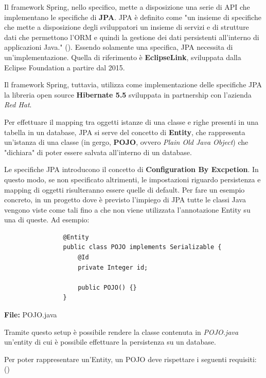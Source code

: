         Il framework Spring, nello specifico, mette a disposizione una serie di API che implementano le specifiche di \textbf{JPA}. JPA è definito come "un insieme di specifiche che mette a disposizione degli sviluppatori un insieme di servizi e di strutture dati che permettono l'ORM e quindi la gestione dei dati persistenti all'interno di applicazioni Java." (\cite{jpa}). Essendo solamente una specifica, JPA necessita di un'implementazione. Quella di riferimento è \textbf{EclipseLink}, sviluppata dalla Eclipse Foundation a partire dal 2015.

        Il framework Spring, tuttavia, utilizza come implementazione delle specifiche JPA la libreria open source \textbf{Hibernate 5.5} sviluppata in partnership con l'azienda \textit{Red Hat}. 

        Per effettuare il mapping tra oggetti istanze di una classe e righe presenti in una tabella in un database, JPA si serve del concetto di \textbf{Entity}, che rappresenta un'istanza di una classe (in gergo, \textbf{POJO}, ovvero \textit{Plain Old Java Object}) che "dichiara" di poter essere salvata all'interno di un database.

        Le specifiche JPA introducono il concetto di \textbf{Configuration By Excpetion}. In questo modo, se non specificato altrimenti, le impostazioni riguardo persistenza e mapping di oggetti risulteranno essere quelle di default. Per fare un esempio concreto, in un progetto dove è previsto l'impiego di JPA tutte le classi Java vengono viste come tali fino a che non viene utilizzata l'annotazione Entity su una di queste. Ad esempio:

        \begin{code}
            \begin{verbatim}
                @Entity
                public class POJO implements Serializable {
                    @Id 
                    private Integer id;

                    public POJO() {}
                }
            \end{verbatim}
            \caption{\textbf{File:} POJO.java}
        \end{code}
    
        Tramite questo setup è possibile rendere la classe contenuta in \textit{POJO.java} un'entity di cui è possibile effettuare la persistenza su un database.\\

        \newpage

        Per poter rappresentare un'Entity, un POJO deve rispettare i seguenti requisiti: (\cite{jee7})

